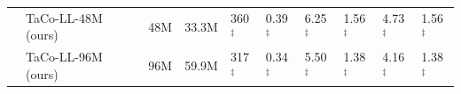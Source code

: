 \begin{table}[tb]
\begin{tabular}{p{0.22cm}p{3.5cm}|lll lllll}
    & \cellcolor{lightpink}TaCo-LL-48M (ours)
    & \cellcolor{lightpink}48M
    & \cellcolor{lightpink}33.3M
    & \cellcolor{lightpink}360$^\ddag$
    & \cellcolor{lightpink}0.39$^\ddag$
    & \cellcolor{lightpink}6.25$^\ddag$
    & \cellcolor{lightpink}1.56$^\ddag$
    & \cellcolor{lightpink}4.73$^\ddag$
    & \cellcolor{lightpink}1.56$^\ddag$ \\

    & \cellcolor{lightpink}TaCo-LL-96M (ours)
    & \cellcolor{lightpink}96M
    & \cellcolor{lightpink}59.9M
    & \cellcolor{lightpink}317$^\ddag$
    & \cellcolor{lightpink}0.34$^\ddag$
    & \cellcolor{lightpink}5.50$^\ddag$
    & \cellcolor{lightpink}1.38$^\ddag$
    & \cellcolor{lightpink}4.16$^\ddag$
    & \cellcolor{lightpink}1.38$^\ddag$ \\
    \bottomrule
    \end{tabular}
    \label{tab:compare-lossless}
\end{table}

